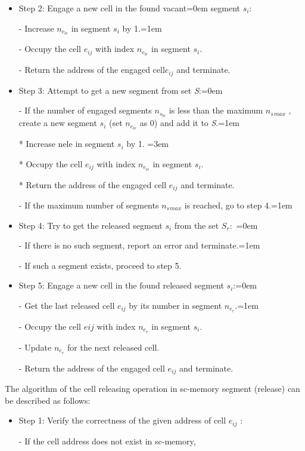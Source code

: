 \documentclass{scndocument}
\begin{document}
\begin{SCn}
\begin{multicols}{2}
\begin{itemize}
\item Step 2: Engage a new cell in the found vacant\leftskip=0em
segment $s_i$:
\item[-]  Increase $n_{e_{le}}$ in segment $s_i$ by 1.\leftskip=1em
\item[-] Occupy the cell $e_{ij}$ with index $n_{e_{le}}$ in segment $s_i$.
\item[-] Return the address of the engaged cell$e_{ij}$ and
terminate.
\item  Step 3: Attempt to get a new segment from set \textit{S}:\leftskip=0em
\item[-] If the number of engaged segments $n_{s_{le}}$ is less than the maximum $ n_s{}_{max}$
, create a new segment $s_i$ (set $n_{e_{le}}$ as 0) and add it to \textit{S}.\leftskip=1em
\item[*] Increase nele in segment $s_i$ by 1. \leftskip=3em
\item[*] Occupy the cell $e_{ij}$ with index $n_{e_{le}}$ in segment $s_i$.
\item[*] Return the address of the engaged cell $e_{ij}$ and terminate.
\item[-] If the maximum number of segments $n_s{}_{max}$ is
reached, go to step 4.\leftskip=1em
\item Step 4: Try to get the released segment $s_i$ from the
set $S_r:$  \leftskip=0em
\item[-] If there is no such segment, report an error and
terminate.\leftskip=1em
\item[-]If such a segment exists, proceed to step 5.
\item Step 5: Engage a new cell in the found released
segment $s_i$:\leftskip=0em
\item[-] Get the last released cell $e_{ij}$ by its number in
segment $n_{e_r}$.\leftskip=1em
\item[-] Occupy the cell  $eij$ with index $n_{e_r}$ in segment  $s_i$.
\item[-] Update $n_{e_r}$ for the next released cell.
\item[-] Return the address of the engaged cell $e_{ij}$ and terminate.
\end{itemize}
The algorithm of the cell releasing operation in sc-memory segment (release) can be described as follows:
\begin{itemize} 
\item Step 1: Verify the correctness of the given address
of cell $e_{ij}$ : 
\item[-] If the cell address does not exist in sc-memory,

\end{itemize}
\end{multicols}
\end{SCn}
\end{document}
